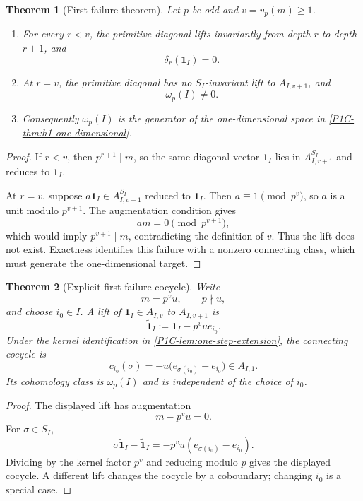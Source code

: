 \documentclass[11pt]{article}
\newtheorem{theorem}{Theorem}[section]
\theoremstyle{remark}
\begin{document}
\begin{theorem}[First-failure theorem]\label{P1C-thm:first-failure}
Let \(p\) be odd and \(v=v_p(m)\ge1\).
\begin{enumerate}[label=\textup{(\roman*)}]
\item For every \(r<v\), the primitive diagonal lifts invariantly from depth \(r\) to depth \(r+1\), and
\[
 \delta_r(\mathbf1_I)=0.
\]
\item At \(r=v\), the primitive diagonal has no \(S_I\)-invariant lift to \(A_{I,v+1}\), and
\[
 \boxed{\omega_p(I)\ne0.}
\]
\item Consequently \(\omega_p(I)\) is the generator of the one-dimensional space in \cref{P1C-thm:h1-one-dimensional}.
\end{enumerate}
\end{theorem}

\begin{proof}
If \(r<v\), then \(p^{r+1}\mid m\), so the same diagonal vector \(\mathbf1_I\) lies in \(A_{I,r+1}^{S_I}\) and reduces to \(\mathbf1_I\).

At \(r=v\), suppose \(a\mathbf1_I\in A_{I,v+1}^{S_I}\) reduced to \(\mathbf1_I\).  Then \(a\equiv1\pmod{p^v}\), so \(a\) is a unit modulo \(p^{v+1}\).  The augmentation condition gives
\[
 am=0\pmod{p^{v+1}},
\]
which would imply \(p^{v+1}\mid m\), contradicting the definition of \(v\).  Thus the lift does not exist.  Exactness identifies this failure with a nonzero connecting class, which must generate the one-dimensional target.
\end{proof}

\begin{theorem}[Explicit first-failure cocycle]\label{P1C-thm:explicit-cocycle}
Write
\[
 m=p^v u,
 \qquad p\nmid u,
\]
and choose \(i_0\in I\).  A lift of \(\mathbf1_I\in A_{I,v}\) to \(A_{I,v+1}\) is
\[
 \widetilde{\mathbf1}_I
 :=\mathbf1_I-p^v u e_{i_0}.
\]
Under the kernel identification in \cref{P1C-lem:one-step-extension}, the connecting cocycle is
\[
 \boxed{
 c_{i_0}(\sigma)
 =-\bar u\bigl(e_{\sigma(i_0)}-e_{i_0}\bigr)
 \in A_{I,1}.}
\]
Its cohomology class is \(\omega_p(I)\) and is independent of the choice of \(i_0\).
\end{theorem}

\begin{proof}
The displayed lift has augmentation
\[
 m-p^v u=0.
\]
For \(\sigma\in S_I\),
\[
 \sigma\widetilde{\mathbf1}_I-\widetilde{\mathbf1}_I
 =-p^v u(e_{\sigma(i_0)}-e_{i_0}).
\]
Dividing by the kernel factor \(p^v\) and reducing modulo \(p\) gives the displayed cocycle.  A different lift changes the cocycle by a coboundary; changing \(i_0\) is a special case.
\end{proof}
\end{document}

